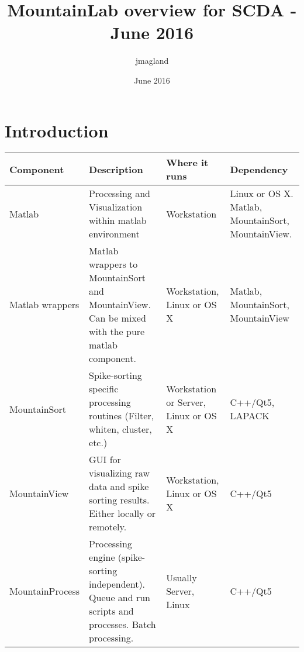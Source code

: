 \documentclass{article}
\title{MountainLab overview for SCDA - June 2016}
\author{jmagland }
\date{June 2016}
\begin{document}
\maketitle

\section{Introduction}


\begin{tabular}{|p{3cm}|p{5cm}|p{3cm}|p{4cm}|}
    \hline
    Component & Description & Where it runs & Dependency \\ \hline
    Matlab & Processing and Visualization within matlab environment & Workstation & Linux or OS X. Matlab, MountainSort, MountainView. \\ \hline
    Matlab wrappers & Matlab wrappers to MountainSort and MountainView. Can be mixed with the pure matlab component. & Workstation, Linux or OS X	& Matlab, MountainSort, MountainView \\ \hline
    MountainSort & Spike-sorting specific processing routines (Filter, whiten, cluster, etc.) & Workstation or Server, Linux or OS X & C++/Qt5, LAPACK \\ \hline
    MountainView & GUI for visualizing raw data and spike sorting results. Either locally or remotely. & Workstation, Linux or OS X & C++/Qt5 \\ \hline
    MountainProcess & Processing engine (spike-sorting independent). Queue and run scripts and processes. Batch processing. & Usually Server, Linux & C++/Qt5 \\ \hline
\end{tabular}
\end{document}
